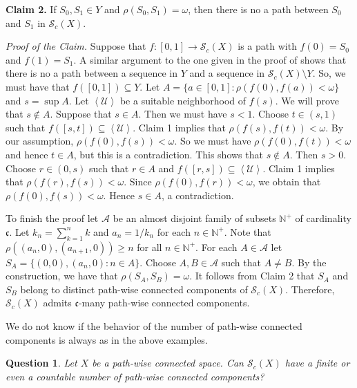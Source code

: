 \documentclass[11pt]{amsart}
\numberwithin{equation}{section}
\theoremstyle{plain}
\newtheorem{question}[equation]{Question}
\theoremstyle{definition}
\theoremstyle{definition}
\theoremstyle{definition}
\theoremstyle{definition}
\theoremstyle{definition}
\begin{document}
\textbf{Claim 2.} If $S_0,S_1 \in Y$ and $\rho(S_0,S_1) = \omega$, then there is no a path between $S_0$ and $S_1$ in $\mathcal{S}_c(X)$.\medskip

\textit{Proof of the Claim.} Suppose that $f : [0,1] \to \mathcal{S}_c(X)$ is a path with $f(0) = S_0$ and $f(1) = S_1$. A similar argument to the one  given in the proof of \cite[Example 2.8]{sal-yas} shows that there is no a path between a sequence in $Y$ and a sequence in $\mathcal{S}_c(X) \setminus Y$. So, we must have that $f([0,1]) \subseteq Y$. Let $A = \{a \in [0,1] : \rho(f(0),f(a)) < \omega\}$ and  $s = \sup A$. Let $\left\langle \mathcal{U}\right\rangle$ be a suitable neighborhood of $f(s)$. We will prove that $s \not\in A$. Suppose that $s \in A$. Then we must have $s < 1$. Choose $t \in (s,1)$ such that $f([s,t]) \subseteq \left\langle \mathcal{U}\right\rangle$. Claim 1 implies that $\rho(f(s),f(t)) < \omega$. By our assumption, $\rho(f(0),f(s)) < \omega$. So we must have $\rho(f(0),f(t)) < \omega$ and hence $t \in A$, but this is a contradiction. This shows that $s \not\in A$. Then $s > 0$. Choose $r \in (0,s)$ such that $r \in A$ and $f([r,s]) \subseteq \left\langle \mathcal{U}\right\rangle$. Claim 1 implies that $\rho(f(r),f(s)) < \omega$. Since $\rho(f(0),f(r)) < \omega$, we obtain that $\rho(f(0),f(s)) < \omega$. Hence $s \in A$, a contradiction.

\medskip

To finish the proof let $\mathcal{A}$ be an almost disjoint family of subsets ${\mathbb N}^+$ of cardinality $\mathfrak{c}$. Let $k_n = \sum_{k = 1}^n k$ and $a_n = 1/k_n$ for each $n \in {\mathbb N}^+$.  Note that $\rho((a_n,0),(a_{n+1},0)) \geq n$ for all $n \in {\mathbb N}^+$. For each $A \in \mathcal{A}$ let $S_A = \{(0,0),(a_n,0) : n \in A\}$. Choose $A,B \in \mathcal{A}$ such that $A \not= B$. By the construction, we have that $\rho(S_A,S_B) = \omega$. It follows from Claim 2 that $S_A$ and $S_B$ belong to distinct path-wise connected components of $\mathcal{S}_c(X)$. Therefore, $\mathcal{S}_c(X)$ admits  $\mathfrak{c}$-many path-wise connected components.
\endproof

We do not know if the behavior of the number of path-wise connected components is always as in the above examples.

\begin{question}
Let $X$ be a path-wise connected space. Can $\mathcal{S}_c(X)$ have a finite or even a countable number of path-wise connected components?
\end{question}
\end{document}
